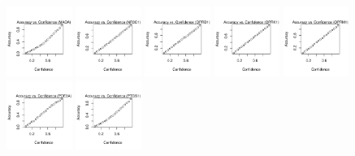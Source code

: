 \documentclass[10pt,article]{memoir}
\begin{document}
\begin{figure}[h!]
\includegraphics[width=0.19\textwidth]{figures/calibration_plots/maoa_calib.pdf}
\includegraphics[width=0.19\textwidth]{figures/calibration_plots/nr3c1_calib.pdf}
\includegraphics[width=0.19\textwidth]{figures/calibration_plots/oprd1_calib.pdf}
\includegraphics[width=0.19\textwidth]{figures/calibration_plots/oprk1_calib.pdf}
\includegraphics[width=0.19\textwidth]{figures/calibration_plots/oprm1_calib.pdf}
\includegraphics[width=0.19\textwidth]{figures/calibration_plots/pde3a_calib.pdf}
\includegraphics[width=0.19\textwidth]{figures/calibration_plots/ptgs1_calib.pdf}

\end{figure}
\end{document}
